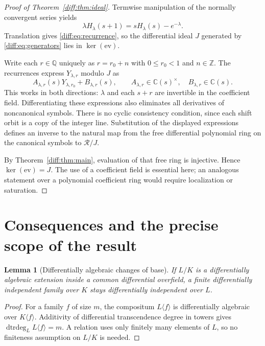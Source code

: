 \documentclass[11pt,a4paper]{article}
\newcommand{\Q}{\mathbb Q}
\newcommand{\C}{\mathbb C}
\DeclareMathOperator{\dtrdeg}{dtrdeg}
\newtheorem{lemma}[theorem]{Lemma}
\theoremstyle{definition}
\theoremstyle{remark}
\numberwithin{equation}{section}
\begin{document}
\begin{proof}[Proof of Theorem~\ref{diff:thm:ideal}]
Termwise manipulation of the normally convergent series yields
\[
 \lambda H_\lambda(s+1)=sH_\lambda(s)-e^{-\lambda}.
\]
Translation gives \eqref{diff:eq:recurrence}, so the differential ideal
$J$ generated by \eqref{diff:eq:generators} lies in $\ker(\mathrm{ev})$.

Write each $r\in\Q$ uniquely as $r=r_0+n$ with
$0\le r_0<1$ and $n\in\mathbb Z$. The recurrences express
$Y_{\lambda,r}$ modulo $J$ as
\[
 A_{\lambda,r}(s)Y_{\lambda,r_0}+B_{\lambda,r}(s),
 \qquad A_{\lambda,r}\in\C(s)^\times,\quad
 B_{\lambda,r}\in\C(s).
\]
This works in both directions: $\lambda$ and each $s+r$ are
invertible in the coefficient field. Differentiating these
expressions also eliminates all derivatives of noncanonical symbols.
There is no cyclic consistency condition, since each shift orbit
is a copy of the integer line. Substitution of the displayed
expressions defines an inverse to the natural map from the free
differential polynomial ring on the canonical symbols to
$\mathcal R/J$.

By Theorem~\ref{diff:thm:main}, evaluation of that free ring is
injective. Hence $\ker(\mathrm{ev})=J$.
The use of a coefficient field is essential here; an analogous
statement over a polynomial coefficient ring would require
localization or saturation.
\end{proof}

\section{Consequences and the precise scope of the result}
\label{diff:sec:consequences}

\begin{lemma}[Differentially algebraic changes of base]\label{diff:lem:basechange}
If $L/K$ is a differentially algebraic extension inside a common
differential overfield, a finite differentially independent family
over $K$ stays differentially independent over $L$.
\end{lemma}
\begin{proof}
For a family $f$ of size $m$, the compositum $L\langle f\rangle$
is differentially algebraic over $K\langle f\rangle$.
Additivity of differential transcendence degree in towers gives
$\dtrdeg_L L\langle f\rangle=m$. A relation uses only finitely
many elements of $L$, so no finiteness assumption on $L/K$ is needed.
\end{proof}
\end{document}
